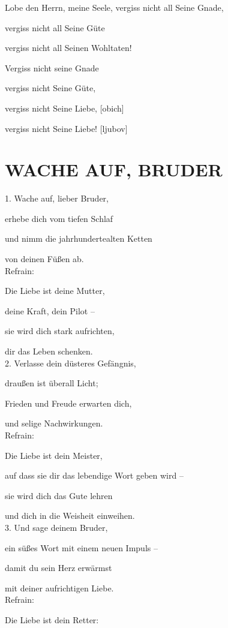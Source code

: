 \documentclass[11pt,a5paper,twoside]{article}
\begin{document}
Lobe den Herrn, meine Seele,
vergiss nicht all Seine Gnade,

vergiss nicht all Seine Güte

vergiss nicht all Seinen Wohltaten!

Vergiss nicht seine Gnade

vergiss nicht Seine Güte,

vergiss nicht Seine Liebe, [obich]

vergiss nicht Seine Liebe! [ljubov]

\section[Wache auf, Bruder]{WACHE AUF, BRUDER}

1. Wache auf, lieber Bruder, 

erhebe dich vom tiefen Schlaf

und nimm die jahrhundertealten Ketten 

von deinen Füßen ab. \\


Refrain:

Die Liebe ist deine Mutter,

deine Kraft, dein Pilot --

sie wird dich stark aufrichten,

dir das Leben schenken.\\


2. Verlasse dein düsteres Gefängnis,

draußen ist überall Licht; 

Frieden und Freude erwarten dich, 

und selige Nachwirkungen.\\

Refrain:

Die Liebe ist dein Meister,

auf dass sie dir das lebendige Wort geben wird --
 
sie wird dich das Gute lehren

und dich in die Weisheit einweihen.\\

3. Und sage deinem Bruder,

ein süßes Wort mit einem neuen Impuls --

damit du sein Herz erwärmst

mit deiner aufrichtigen Liebe.\\

Refrain:

Die Liebe ist dein Retter:
\end{document}

